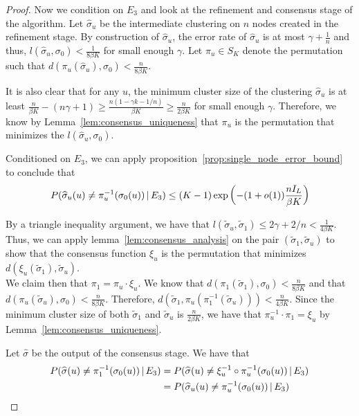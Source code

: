 \begin{proof}
Now we condition on $E_3$ and look at the refinement and consensus stage of the algorithm. Let $\hat{\sigma}_u$ be the intermediate clustering on $n$ nodes created in the refinement stage. By construction of $\hat{\sigma}_u$, the error rate of $\hat{\sigma}_u$ is at most $ \gamma + \frac{1}{n}$ and thus, $l(\hat{\sigma}_u, \sigma_0) < \frac{1}{8 \beta K}$ for small enough $\gamma$. Let $\pi_u \in S_K$ denote the permutation such that $d(\pi_u(\hat{\sigma}_u), \sigma_0) < \frac{n}{8\beta K}$. 

It is also clear that for any $u$, the minimum cluster size of the clustering $\hat{\sigma}_u$ is at least $\frac{n}{\beta K} - (n \gamma + 1) \geq \frac{ n(1 - \gamma k - 1/n)}{\beta K} \geq \frac{n}{2\beta K}$ for small enough $\gamma$. Therefore, we know by Lemma~\ref{lem:consensus_uniqueness} that $\pi_u$ is the permutation that minimizes the $l(\hat{\sigma}_u, \sigma_0)$. 

Conditioned on $E_3$, we can apply proposition~\ref{prop:single_node_error_bound} to conclude that
\[
 P( \widehat{\sigma}_u(u) \neq \pi^{-1}_u(\sigma_0(u)) {\,|\,} E_3) \leq (K-1) \exp\left( - (1+o(1)) \frac{n I_L}{\beta K} \right)
\]


By a triangle inequality argument, we have that $l(\tilde{\sigma}_u, \tilde{\sigma}_1) \leq 2\gamma + 2/n < \frac{1}{4\beta K}$. Thus, we can apply lemma~\ref{lem:consensus_analysis} on the pair $(\tilde{\sigma}_1, \tilde{\sigma}_u)$ to show that the consensus function $\xi_u$ is the permutation that minimizes 
$d(\xi_u(\tilde{\sigma}_1), \tilde{\sigma}_u)$.\\

We claim then that $\pi_1 = \pi_u \cdot \xi_u$. We know that $d(\pi_1(\tilde{\sigma}_1), \sigma_0) < \frac{n}{8 \beta K}$ and that $d(\pi_u(\tilde{\sigma}_u), \sigma_0) < \frac{n}{8 \beta K}$. Therefore, $d(\tilde{\sigma}_1, \pi_u( \pi_1^{-1}(\tilde{\sigma}_u))) < \frac{n}{4 \beta K}$. Since the minimum cluster size of both $\tilde{\sigma}_1$ and $\tilde{\sigma}_u$ is $\frac{n}{2 \beta K}$, we have that $\pi_u^{-1} \cdot \pi_1 = \xi_u$ by Lemma~\ref{lem:consensus_uniqueness}.

Let $\hat{\sigma}$ be the output of the consensus stage. We have that
\begin{align*}
P( \widehat{\sigma}(u) \neq \pi_1^{-1} ( \sigma_0(u)) {\,|\,} E_3) &= P( \widehat{\sigma}(u) \neq \xi_u^{-1} \circ \pi_u^{-1} (\sigma_0(u)) {\,|\,} E_3)\\
   &= P( \widehat{\sigma}_u(u) \neq \pi_u^{-1} (\sigma_0(u)) {\,|\,} E_3) 
\end{align*}


\end{proof}

